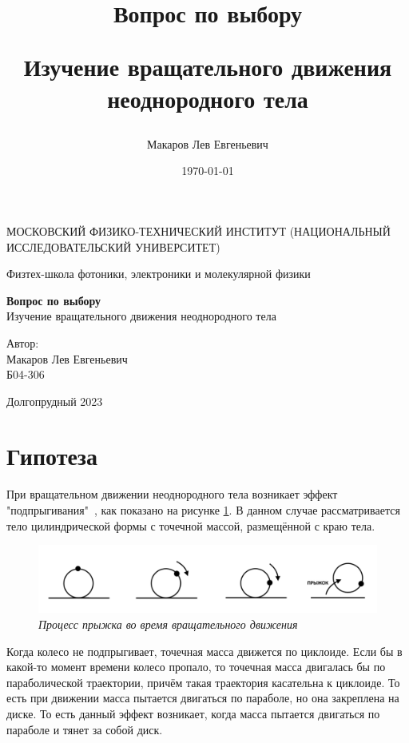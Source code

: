 \documentclass[a4paper,12pt]{article}
\author{Макаров Лев Евгеньевич}
\title{Вопрос по выбору

Изучение вращательного движения неоднородного тела
}
\date{\today}
\begin{document}
\begin{titlepage}
	\begin{center}
		{\large МОСКОВСКИЙ ФИЗИКО-ТЕХНИЧЕСКИЙ ИНСТИТУТ (НАЦИОНАЛЬНЫЙ ИССЛЕДОВАТЕЛЬСКИЙ УНИВЕРСИТЕТ)}
	\end{center}
	\begin{center}
		{\large Физтех-школа фотоники, электроники и молекулярной физики}
	\end{center}
	
	
	\vspace{4.5cm}
	{\huge
		\begin{center}
			{\bf Вопрос по выбору}\\
			Изучение вращательного движения неоднородного тела
		\end{center}
	}
	\vspace{2cm}
	\begin{flushright}
		{\LARGE Автор:\\ Макаров Лев Евгеньевич \\
			\vspace{0.2cm}
			Б04-306}
	\end{flushright}
	\vspace{8cm}
	\begin{center}
		Долгопрудный 2023
	\end{center}
\end{titlepage}

\section{Гипотеза}

При вращательном движении неоднородного тела возникает эффект "подпрыгивания"\ , как показано на рисунке \ref{hop-scheme}. В данном случае рассматривается тело цилиндрической формы с точечной массой, размещённой с краю тела.

\begin{figure}[h!]
        \centering
	\includegraphics[width=1\textwidth]{hop-scheme.png}
	\caption{\textit{Процесс прыжка во время вращательного движения}}
	\label{hop-scheme}
\end{figure}

Когда колесо не подпрыгивает, точечная масса движется по циклоиде. Если бы в какой-то момент времени колесо пропало, то точечная масса двигалась бы по параболической траектории, причём такая траектория касательна к циклоиде. То есть при движении масса пытается двигаться по параболе, но она закреплена на диске. То есть данный эффект возникает, когда масса пытается двигаться по параболе и тянет за собой диск.
\end{document}
